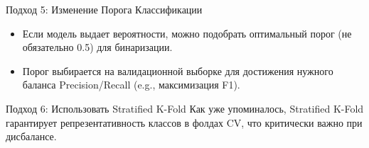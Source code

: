 \begin{myblock}{Подход 5: Изменение Порога Классификации}
    \begin{itemize}[nosep, leftmargin=*]
        \item Если модель выдает вероятности, можно подобрать оптимальный порог (не обязательно 0.5) для бинаризации.
        \item Порог выбирается на валидационной выборке для достижения нужного баланса Precision/Recall (e.g., максимизация F1).
    \end{itemize}
\end{myblock}

\begin{myblock}{Подход 6: Использовать Stratified K-Fold}
    Как уже упоминалось, Stratified K-Fold гарантирует репрезентативность классов в фолдах CV, что критически важно при дисбалансе.
\end{myblock}